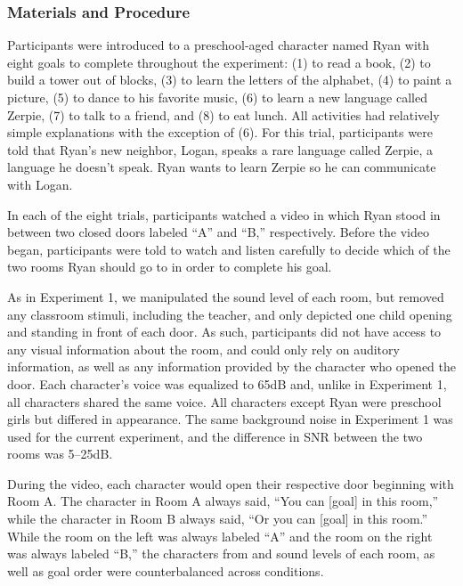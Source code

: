 \documentclass[10pt, letterpaper]{article}
\begin{document}
\hypertarget{materials-and-procedure-2}{%
\subsubsection{Materials and
Procedure}\label{materials-and-procedure-2}}

Participants were introduced to a preschool-aged character named Ryan
with eight goals to complete throughout the experiment: (1) to read a
book, (2) to build a tower out of blocks, (3) to learn the letters of
the alphabet, (4) to paint a picture, (5) to dance to his favorite
music, (6) to learn a new language called Zerpie, (7) to talk to a
friend, and (8) to eat lunch. All activities had relatively simple
explanations with the exception of (6). For this trial, participants
were told that Ryan's new neighbor, Logan, speaks a rare language called
Zerpie, a language he doesn't speak. Ryan wants to learn Zerpie so he
can communicate with Logan.

In each of the eight trials, participants watched a video in which Ryan
stood in between two closed doors labeled ``A'' and ``B,'' respectively.
Before the video began, participants were told to watch and listen
carefully to decide which of the two rooms Ryan should go to in order to
complete his goal.

As in Experiment 1, we manipulated the sound level of each room, but
removed any classroom stimuli, including the teacher, and only depicted
one child opening and standing in front of each door. As such,
participants did not have access to any visual information about the
room, and could only rely on auditory information, as well as any
information provided by the character who opened the door. Each
character's voice was equalized to 65dB and, unlike in Experiment 1, all
characters shared the same voice. All characters except Ryan were
preschool girls but differed in appearance. The same background noise in
Experiment 1 was used for the current experiment, and the difference in
SNR between the two rooms was 5--25dB.

During the video, each character would open their respective door
beginning with Room A. The character in Room A always said, ``You can
{[}goal{]} in this room,'' while the character in Room B always said,
``Or you can {[}goal{]} in this room.'' While the room on the left was
always labeled ``A'' and the room on the right was always labeled ``B,''
the characters from and sound levels of each room, as well as goal order
were counterbalanced across conditions.
\end{document}
